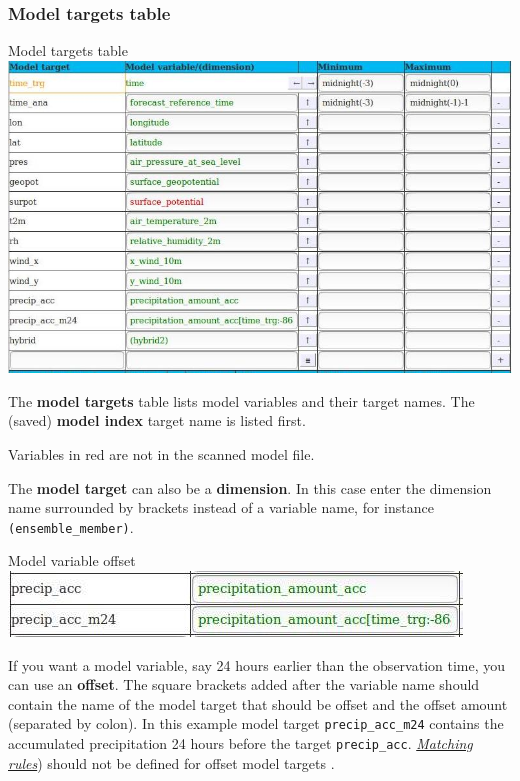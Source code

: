 \documentclass[letterpaper,10pt,twoside,twocolumn,openany]{book}
\begin{document}
\subsubsection{Model targets table}
\begin{paperbox}{Model targets table}
  \includegraphics[width=\columnwidth]{coloc_model.jpg}
\end{paperbox}
The {\bf model targets} table lists model variables and their target names.
The (saved) {\bf model index} target name is listed first.
\begin{quotebox}
  Variables in red are not in the scanned model file.
\end{quotebox}
The {\bf model target} can also be a {\bf dimension}. 
In this case enter the dimension name surrounded by brackets instead of a variable name,
for instance \lstinline!(ensemble_member)!.
\begin{paperbox}{Model variable offset}
  \includegraphics[width=\columnwidth]{offset.jpg}
\end{paperbox}
If you want a model variable, say 24 hours earlier than the observation time, you can use an {\bf offset}.
The square brackets added after the variable name should contain the 
name of the model target that should be offset and the offset amount (separated by colon).
In this example model target \lstinline!precip_acc_m24! contains the accumulated precipitation 24 
hours before the target \lstinline!precip_acc!.
\hyperlink{matching}{\em Matching rules}) should not be defined for offset model targets .
\end{document}
